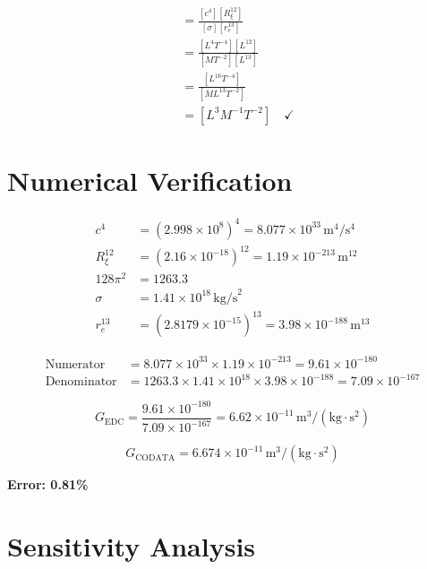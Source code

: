 \documentclass[12pt,a4paper,openany]{book}
\theoremstyle{definition}
\theoremstyle{plain}
\theoremstyle{remark}
\newcommand{\re}{r_e}                      %
\newcommand{\Rxi}{R_\xi}                   %
\begin{document}
\begin{dimcheckbox}
\begin{align}
[G] &= \frac{[c^4][\Rxi^{12}]}{[\sigma][\re^{13}]} \\
&= \frac{[L^4 T^{-4}][L^{12}]}{[M T^{-2}][L^{13}]} \\
&= \frac{[L^{16} T^{-4}]}{[M L^{13} T^{-2}]} \\
&= [L^3 M^{-1} T^{-2}] \quad \checkmark
\end{align}
\end{dimcheckbox}

\section{Numerical Verification}

\begin{align}
c^4 &= (2.998 \times 10^8)^4 = 8.077 \times 10^{33}\,\text{m}^4/\text{s}^4 \\
\Rxi^{12} &= (2.16 \times 10^{-18})^{12} = 1.19 \times 10^{-213}\,\text{m}^{12} \\
128\pi^2 &= 1263.3 \\
\sigma &= 1.41 \times 10^{18}\,\text{kg/s}^2 \\
\re^{13} &= (2.8179 \times 10^{-15})^{13} = 3.98 \times 10^{-188}\,\text{m}^{13}
\end{align}

\begin{align}
\text{Numerator} &= 8.077 \times 10^{33} \times 1.19 \times 10^{-213} = 9.61 \times 10^{-180} \\
\text{Denominator} &= 1263.3 \times 1.41 \times 10^{18} \times 3.98 \times 10^{-188} = 7.09 \times 10^{-167}
\end{align}

\begin{equation}
G_{\text{EDC}} = \frac{9.61 \times 10^{-180}}{7.09 \times 10^{-167}} = 6.62 \times 10^{-11}\,\text{m}^3/(\text{kg}\cdot\text{s}^2)
\end{equation}

\begin{equation}
G_{\text{CODATA}} = 6.674 \times 10^{-11}\,\text{m}^3/(\text{kg}\cdot\text{s}^2)
\end{equation}

\textbf{Error: 0.81\%}

\section{Sensitivity Analysis}
\end{document}
